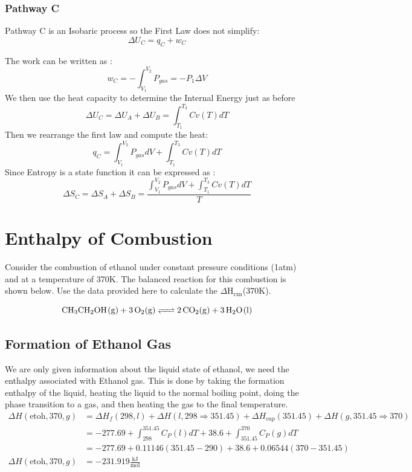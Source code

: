 \documentclass{article}
\newcommand{\be}{\begin{equation}}
\newcommand{\ee}{\end{equation}}
\begin{document}
\subsubsection*{Pathway C}
Pathway C is an Isobaric process so the First Law does not simplify:
\be
\Delta U_C = q_C + w_C 
\ee

The work can be written as : 
\be
w_C = -\int_{V_1}^{V_2} P_{gas} = -P_1\Delta V
\ee
We then use the heat capacity to determine the Internal Energy just as before
\be
\Delta U_C = \Delta U_A + \Delta U_B = \int_{T_1}^{T_3} Cv(T)dT
\ee
Then we rearrange the first law and compute the heat: 
\be
q_C =  \int_{V_1}^{V_2} P_{gas} dV +\int_{T_1}^{T_3} Cv(T)dT
\ee
Since Entropy is a state function it can be expressed as : 
\be
\Delta S _C = \Delta S_A + \Delta S_B =  \frac{\int_{V_1}^{V_2} P_{gas} dV +\int_{T_1}^{T_3} Cv(T) dT}{T}
\ee

\newpage

\section{Enthalpy of Combustion}
Consider the combustion of ethanol under constant pressure conditions (1atm) and at a temperature of 370K. 
The balanced reaction for this combustion is shown below. 
Use the data provided here to calculate the $\Delta$H$_{\text{rxn}}$(370K).

\be
\ce{CH3CH2OH(g) + 3O2(g) <=> 2CO2(g) + 3H2O(l)}
\ee

\subsection*{Formation of Ethanol Gas}
We are only given information about the liquid state of ethanol, we need the enthalpy associated with Ethanol gas. 
This is done by taking the formation enthalpy of the liquid, heating the liquid to the normal boiling point, doing the phase transition to a  gas, and then heating the gas to the final temperature. 
\be
\begin{split}
\Delta H(\text{etoh},370,g) &= \Delta H_f(298,l) + \Delta H(l,298\Rightarrow 351.45) + \Delta H_{vap}(351.45) + \Delta H(g, 351.45 \Rightarrow 370)\\
&= -277.69 + \int_{298}^{351.45} C_P(l)dT + 38.6 + \int_{351.45}^{370} C_P(g) dT \\ 
&= -277.69 + 0.11146(351.45-290) + 38.6 + 0.06544(370-351.45) \\
\Delta H(\text{etoh},370,g) &= -231.919 \frac{\text{kJ}}{\text{mol}}
\end{split}
\ee
\end{document}
